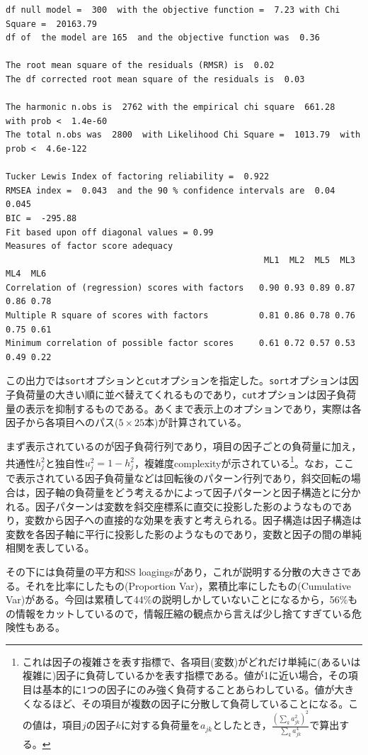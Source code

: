 \documentclass[
  a4paper,
]{ltjsbook}
\begin{document}
\begin{verbatim}
df null model =  300  with the objective function =  7.23 with Chi Square =  20163.79
df of  the model are 165  and the objective function was  0.36 

The root mean square of the residuals (RMSR) is  0.02 
The df corrected root mean square of the residuals is  0.03 

The harmonic n.obs is  2762 with the empirical chi square  661.28  with prob <  1.4e-60 
The total n.obs was  2800  with Likelihood Chi Square =  1013.79  with prob <  4.6e-122 

Tucker Lewis Index of factoring reliability =  0.922
RMSEA index =  0.043  and the 90 % confidence intervals are  0.04 0.045
BIC =  -295.88
Fit based upon off diagonal values = 0.99
Measures of factor score adequacy             
                                                   ML1  ML2  ML5  ML3  ML4  ML6
Correlation of (regression) scores with factors   0.90 0.93 0.89 0.87 0.86 0.78
Multiple R square of scores with factors          0.81 0.86 0.78 0.76 0.75 0.61
Minimum correlation of possible factor scores     0.61 0.72 0.57 0.53 0.49 0.22
\end{verbatim}

この出力では\texttt{sort}オプションと\texttt{cut}オプションを指定した。\texttt{sort}オプションは因子負荷量の大きい順に並べ替えてくれるものであり，\texttt{cut}オプションは因子負荷量の表示を抑制するものである。あくまで表示上のオプションであり，実際は各因子から各項目へのパス(\(5 \times 25\)本)が計算されている。

まず表示されているのが因子負荷行列であり，項目の因子ごとの負荷量に加え，共通性\(h_j^2\)と独自性\(u_j^2=1-h_j^2\)，複雑度complexityが示されている\footnote{これは因子の複雑さを表す指標で、各項目(変数)がどれだけ単純に(あるいは複雑に)因子に負荷しているかを表す指標である。値が1に近い場合，その項目は基本的に1つの因子にのみ強く負荷することあらわしている。値が大きくなるほど、その項目が複数の因子に分散して負荷していることになる。この値は，項目\(j\)の因子\(k\)に対する負荷量を\(a_{jk}\)としたとき，\(\frac{(\sum_k a_{jk}^2)^2}{\sum_k a_{jk}^4}\)で算出する。}。なお，ここで表示されている因子負荷量などは回転後のパターン行列であり，斜交回転の場合は，因子軸の負荷量をどう考えるかによって因子パターンと因子構造とに分かれる。因子パターンは変数を斜交座標系に直交に投影した影のようなものであり，変数から因子への直接的な効果を表すと考えられる。因子構造は因子構造は変数を各因子軸に平行に投影した影のようなものであり，変数と因子の間の単純相関を表している。

その下には負荷量の平方和SS
loagingsがあり，これが説明する分散の大きさである。それを比率にしたもの(Proportion
Var)，累積比率にしたもの(Cumulative
Var)がある。今回は累積して44\%の説明しかしていないことになるから，56\%もの情報をカットしているので，情報圧縮の観点から言えば少し捨てすぎている危険性もある。
\end{document}
